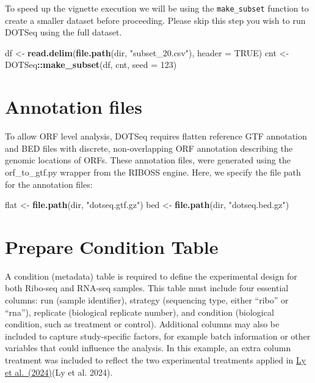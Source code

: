 \documentclass[
]{article}
\newenvironment{Shaded}{\begin{snugshade}}{\end{snugshade}}
\newcommand{\AttributeTok}[1]{\textcolor[rgb]{0.13,0.29,0.53}{#1}}
\newcommand{\ConstantTok}[1]{\textcolor[rgb]{0.56,0.35,0.01}{#1}}
\newcommand{\DecValTok}[1]{\textcolor[rgb]{0.00,0.00,0.81}{#1}}
\newcommand{\FunctionTok}[1]{\textcolor[rgb]{0.13,0.29,0.53}{\textbf{#1}}}
\newcommand{\NormalTok}[1]{#1}
\newcommand{\OtherTok}[1]{\textcolor[rgb]{0.56,0.35,0.01}{#1}}
\newcommand{\SpecialCharTok}[1]{\textcolor[rgb]{0.81,0.36,0.00}{\textbf{#1}}}
\newcommand{\StringTok}[1]{\textcolor[rgb]{0.31,0.60,0.02}{#1}}
\begin{document}
To speed up the vignette execution we will be using the
\texttt{make\_subset} function to create a smaller dataset before
proceeding. Please skip this step you wish to run DOTSeq using the full
dataset.

\begin{Shaded}
\begin{Highlighting}[]
\NormalTok{df }\OtherTok{\textless{}{-}} \FunctionTok{read.delim}\NormalTok{(}\FunctionTok{file.path}\NormalTok{(dir, }\StringTok{"subset\_20.csv"}\NormalTok{), }\AttributeTok{header =} \ConstantTok{TRUE}\NormalTok{)}
\NormalTok{cnt }\OtherTok{\textless{}{-}}\NormalTok{ DOTSeq}\SpecialCharTok{::}\FunctionTok{make\_subset}\NormalTok{(df, cnt, }\AttributeTok{seed =} \DecValTok{123}\NormalTok{)}
\end{Highlighting}
\end{Shaded}

\section{Annotation files}\label{annotation-files}

To allow ORF level analysis, DOTSeq requires flatten reference GTF
annotation and BED files with discrete, non-overlapping ORF annotation
describing the genomic locations of ORFs. These annotation files, were
generated using the orf\_to\_gtf.py wrapper from the RIBOSS engine.
Here, we specify the file path for the annotation files:

\begin{Shaded}
\begin{Highlighting}[]
\NormalTok{flat }\OtherTok{\textless{}{-}} \FunctionTok{file.path}\NormalTok{(dir, }\StringTok{"dotseq.gtf.gz"}\NormalTok{)}
\NormalTok{bed }\OtherTok{\textless{}{-}} \FunctionTok{file.path}\NormalTok{(dir, }\StringTok{"dotseq.bed.gz"}\NormalTok{)}
\end{Highlighting}
\end{Shaded}

\section{Prepare Condition Table}\label{prepare-condition-table}

A condition (metadata) table is required to define the experimental
design for both Ribo-seq and RNA-seq samples. This table must include
four essential columns: run (sample identifier), strategy (sequencing
type, either ``ribo'' or ``rna''), replicate (biological replicate
number), and condition (biological condition, such as treatment or
control). Additional columns may also be included to capture
study-specific factors, for example batch information or other variables
that could influence the analysis. In this example, an extra column
treatment was included to reflect the two experimental treatments
applied in \href{https://doi.org/10.1038/s41586-024-08088-3}{Ly et
al.~(2024)}(Ly et al. 2024).
\end{document}
